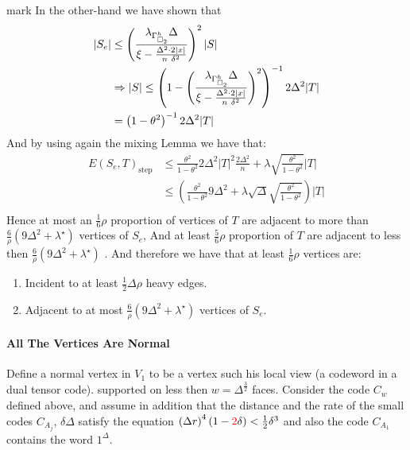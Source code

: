 \documentclass{article}
\begin{document}
\begin{multicols*}{2}
    \color{red} mark \color{black} In the other-hand we have shown that 
 \begin{equation*}
   \begin{split}
     |S_{e}| &  \le \left( \frac{ \lambda_{\Gamma_{\square_{2}}^{h}}\Delta}{\xi - \frac{\Delta^{2}\cdot 2|x|}{n\ \delta^{2}} } \right)^{2} |S| \\ &
     \Rightarrow |S| \le \left( 1 - \left( \frac{ \lambda_{\Gamma_{\square_{2}}^{h}}\Delta}{\xi - \frac{\Delta^{2}\cdot 2|x|}{n\ \delta^{2}} } \right)^{2}\right)^{-1}2\Delta^{2}|T| \\
     & = \left( 1 - \theta^2 \right)^{-1} 2 \Delta^{2} |T|
   \end{split}
 \end{equation*}
 And by using again the mixing Lemma we have that: 
 \begin{equation*}
   \begin{split}
     E\left( S_{e},T \right)_{\text{step}} &\le \frac{\theta^2}{1- \theta^2}2\Delta^{2}|T|^2 \frac{2\Delta^{2}}{n} + \lambda\sqrt{\frac{\theta^2}{1- \theta^2}}|T| \\ 
     & \le  \left( \frac{\theta^2}{1- \theta^2}9\Delta^{2} + \lambda\sqrt{\Delta}\sqrt{\frac{\theta^2}{1- \theta^2}}\right)|T| \\ 
  \end{split}
 \end{equation*}
 Hence at most an $\frac{1}{6}\rho $ proportion of vertices of $T$ are adjacent to more than $\frac{6}{\rho} \left( 9\Delta^{2} + \lambda^{\star}  \right) $ vertices of $S_{e}$, And at least $\frac{5}{6}\rho$ proportion of $T$ are adjacent to less then $\frac{6}{\rho} \left( 9\Delta^{2} + \lambda^{\star}  \right) $ . 
 And therefore we have that at least $\frac{1}{6}\rho$ vertices are:
 \begin{enumerate}
   \item Incident to at least $\frac{1}{2}\Delta\rho$ heavy edges. 
   \item Adjacent to at most $ \frac{6}{\rho} \left( 9\Delta^{2} + \lambda^{\star}  \right)$ vertices of $S_{e}$.  
 \end{enumerate}
	\paragraph{All The Vertices Are Normal} Define a normal vertex in $ V_{1} $ to be a vertex such his local view (a codeword in a dual tensor code). 
	supported on less then $w = \Delta^\frac{3}{2}$ faces.
	Consider the code $C_{w}$ defined above, and assume in addition that the distance and the rate of 
	the small codes $C_{A_{j}}$, $\delta \Delta$ satisfy the equation $ \left(\Delta r\right)^{4}\left(1 - \color{red}2\color{black}\delta\right) < \frac{1}{2}\delta^{3} $ and also the code $ C_{A_{1}}  $ 
      contains the word $ 1^{\Delta} $.



\end{multicols*}
\end{document}
